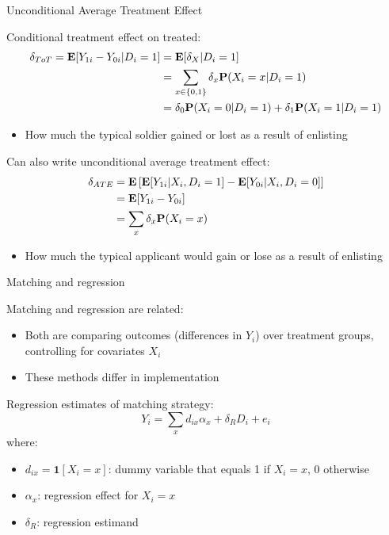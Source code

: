 \documentclass[compress, 8pt]{beamer}
\begin{document}
\begin{frame}{Unconditional Average Treatment Effect}

Conditional treatment effect on treated:
\begin{align*}
    \delta_{ToT} = \mathbf{E} [Y_{1i} - Y_{0i} \vert D_i = 1] &= \mathbf{E} [\delta_X \vert D_i = 1] \\
    &= \sum_{x \in \{0, 1\}} \delta_x \mathbf{P}(X_i = x \vert D_i = 1 ) \\
    &= \delta_0 \mathbf{P} (X_i = 0 \vert D_i = 1)
    + \delta_1 \mathbf{P} (X_i = 1 \vert D_i = 1)
\end{align*}
\begin{itemize}
    \item How much the typical soldier gained or lost as a result of enlisting
\end{itemize}

\vspace{2ex}
Can also write unconditional average treatment effect:
\begin{align*}
    \delta_{ATE} &= \mathbf{E} \left[ 
        \mathbf{E} [Y_{1i} \vert X_i, D_i = 1]
        - \mathbf{E} [Y_{0i} \vert X_i, D_i = 0]
    \right] \\
    &= \mathbf{E} [Y_{1i} - Y_{0i}] \\
    &= \sum_x \delta_x \mathbf{P}(X_i = x)
\end{align*}
\begin{itemize}
    \item How much the typical applicant would gain or lose as a result of enlisting
\end{itemize}

\end{frame}





\begin{frame}{Matching and regression}

Matching and regression are related:
\begin{itemize}
    \item Both are comparing outcomes (differences in $Y_i$) over treatment groups, controlling for covariates $X_i$
    \item These methods differ in implementation
\end{itemize}
Regression estimates of matching strategy:
\begin{equation*}
    Y_i = \sum_x d_{ix} \alpha_x + \delta_R D_i + e_i
\end{equation*}
where:
\begin{itemize}
    \item $d_{ix} = \mathbf{1} [X_i = x]$: dummy variable that equals 1 if $X_i = x$, 0 otherwise
    \item $\alpha_x$: regression effect for $X_i = x$
    \item $\delta_R$: regression estimand
\end{itemize}

\end{frame}
\end{document}
